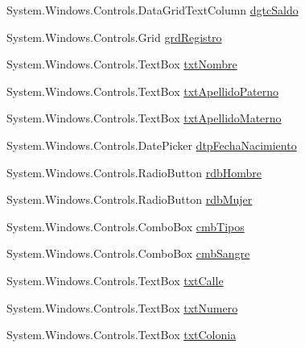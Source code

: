 \begin{DoxyCompactItemize}
\item 
System.\-Windows.\-Controls.\-Data\-Grid\-Text\-Column \hyperlink{class_proyecto___integrador__3_1_1_main_window_a4ebf6bc961d2d0fab8efaa8e3ea2879c}{dgtc\-Saldo}
\item 
System.\-Windows.\-Controls.\-Grid \hyperlink{class_proyecto___integrador__3_1_1_main_window_a9386928aff943060071efe864b17ca03}{grd\-Registro}
\item 
System.\-Windows.\-Controls.\-Text\-Box \hyperlink{class_proyecto___integrador__3_1_1_main_window_a66650387b40eb348806d9692d163e03a}{txt\-Nombre}
\item 
System.\-Windows.\-Controls.\-Text\-Box \hyperlink{class_proyecto___integrador__3_1_1_main_window_a84bcf28ad1df8514c1b1646ab9a62513}{txt\-Apellido\-Paterno}
\item 
System.\-Windows.\-Controls.\-Text\-Box \hyperlink{class_proyecto___integrador__3_1_1_main_window_ad6d2f2927d00f63954e85d4609c9c2b6}{txt\-Apellido\-Materno}
\item 
System.\-Windows.\-Controls.\-Date\-Picker \hyperlink{class_proyecto___integrador__3_1_1_main_window_a366d1c04863cd090fb2a941de8adbd3d}{dtp\-Fecha\-Nacimiento}
\item 
System.\-Windows.\-Controls.\-Radio\-Button \hyperlink{class_proyecto___integrador__3_1_1_main_window_a18bdb73ede87b12a96e18de224a8d780}{rdb\-Hombre}
\item 
System.\-Windows.\-Controls.\-Radio\-Button \hyperlink{class_proyecto___integrador__3_1_1_main_window_ad63d95f7d01cf55567a764c385df5542}{rdb\-Mujer}
\item 
System.\-Windows.\-Controls.\-Combo\-Box \hyperlink{class_proyecto___integrador__3_1_1_main_window_a6ffda9fa41aae566606ef782be37ed11}{cmb\-Tipos}
\item 
System.\-Windows.\-Controls.\-Combo\-Box \hyperlink{class_proyecto___integrador__3_1_1_main_window_a78f29679759491825a6a30ad89e8a867}{cmb\-Sangre}
\item 
System.\-Windows.\-Controls.\-Text\-Box \hyperlink{class_proyecto___integrador__3_1_1_main_window_afbbf986bc8047e3cade1e2ab50a1402c}{txt\-Calle}
\item 
System.\-Windows.\-Controls.\-Text\-Box \hyperlink{class_proyecto___integrador__3_1_1_main_window_aa5f2bae20c9397b7c6ea3926afebd5ce}{txt\-Numero}
\item 
System.\-Windows.\-Controls.\-Text\-Box \hyperlink{class_proyecto___integrador__3_1_1_main_window_a3c03dcfb84d69ba923dcc7d54d98c569}{txt\-Colonia}
\item 

\end{DoxyCompactItemize}
